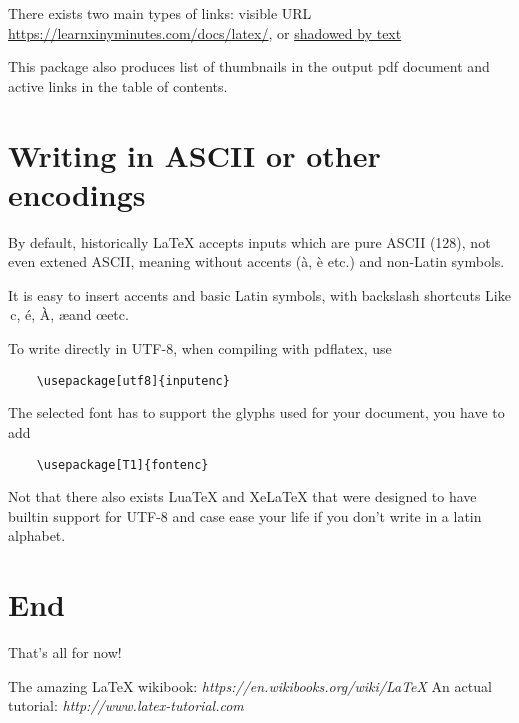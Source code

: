 \documentclass[12pt]{article}
\begin{document}
There exists two main types of links: visible URL \\
\url{https://learnxinyminutes.com/docs/latex/}, or
\href{https://learnxinyminutes.com/docs/latex/}{shadowed by text}

This package also produces list of thumbnails in the output pdf document and
active links in the table of contents.

\section{Writing in ASCII or other encodings}

By default, historically LaTeX accepts inputs which are pure ASCII (128),
not even extened ASCII, meaning without accents (à, è etc.) and non-Latin symbols.

It is easy to insert accents and basic Latin symbols, with backslash shortcuts
Like \,c, \'e, \`A, \ae and \oe etc.  %

To write directly in UTF-8, when compiling with pdflatex, use
\begin{verbatim}
    \usepackage[utf8]{inputenc}
\end{verbatim}
The selected font has to support the glyphs used for your document, you have to add
\begin{verbatim}
    \usepackage[T1]{fontenc}
\end{verbatim}

Not that there also exists LuaTeX and XeLaTeX that were designed to have builtin
support for UTF-8 and case ease your life if you don't write in a latin alphabet.

\section{End}

That's all for now!

\begin{thebibliography}{1}
   The amazing \LaTeX{} wikibook: \emph{https://en.wikibooks.org/wiki/LaTeX}
   An actual tutorial: \emph{http://www.latex-tutorial.com}
\end{thebibliography}

\end{document}
